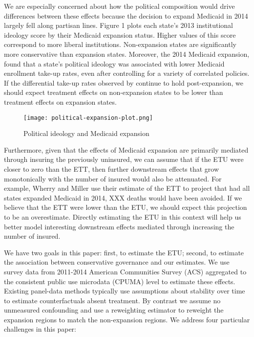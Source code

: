 \documentclass[final]{article}
\begin{document}
We are especially concerned about how the political composition would drive differences between these effects because the decision to expand Medicaid in 2014 largely fell along partisan lines. Figure 1 plots each state's 2013 institutional ideology score by their Medicaid expansion status. Higher values of this score correspond to more liberal institutions. Non-expansion states are significantly more conservative than expansion states. Moreover, the 2014 Medicaid expansion, \cite{sommers2012understanding} found that a state's political ideology was associated with lower Medicaid enrollment take-up rates, even after controlling for a variety of correlated policies. If the differential take-up rates observed by \cite{sommers2012understanding} continue to hold post-expansion, we should expect treatment effects on non-expansion states to be lower than treatment effects on expansion states. 

\begin{figure}
    \texttt{[image: political-expansion-plot.png]}
    \caption{Political ideology and Medicaid expansion}
\end{figure}

Furthermore, given that the effects of Medicaid expansion are primarily mediated through insuring the previously uninsured, we can assume that if the ETU were closer to zero than the ETT, then further downstream effects that grow monotonically with the number of insured would also be attenuated. For example, Wherry and Miller use their estimate of the ETT to project that had all states expanded Medicaid in 2014, XXX deaths would have been avoided. If we believe that the ETT were lower than the ETU, we should expect this projection to be an overestimate. Directly estimating the ETU in this context will help us better model interesting downstream effects mediated through increasing the number of insured.

We have two goals in this paper: first, to estimate the ETU; second, to estimate the association between conservative governance and our estimates. We use survey data from 2011-2014 American Communities Survey (ACS) aggregated to the consistent public use microdata (CPUMA) level to estimate these effects. Existing panel-data methods typically use assumptions about stability over time to estimate counterfactuals absent treatment. By contrast we assume no unmeasured confounding and use a reweighting estimator to reweight the expansion regions to match the non-expansion regions. We address four particular challenges in this paper: 
\end{document}
